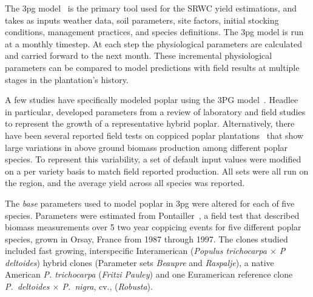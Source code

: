 \documentclass[preprint,12pt]{elsarticle}
\begin{document}
The \acf{3pg} model~\cite{Landsberg1997, landsberg2010physiological,
  Sands2004} is the primary tool used for the \ac{SRWC} yield
estimations, and takes as inputs weather data, soil parameters, site
factors, initial stocking conditions, management practices, and
species definitions.  The \ac{3pg} model is run at a monthly
timestep. At each step the physiological parameters are calculated and
carried forward to the next month.
These incremental physiological parameters
can be compared to model predictions with field results at multiple
stages in the plantation's history.

A few studies have specifically modeled poplar using the 3PG
model~\cite{Amichev2010,Headlee2012,Zalesny2012}. Headlee~\cite{Headlee2012} in
particular, developed parameters from a review of laboratory and field
studies to represent the growth of a representative hybrid poplar.
Alternatively, there have been several reported field tests on
coppiced poplar
plantations~\cite{Proe2002,Proe1999,Pontailler1999,Afas2008a} that
show large variations in above ground biomass production among
different poplar species.  To represent this variability, a set of default input values were modified on a per
variety basis to match field reported production.  All sets were all
run on the region, and the average yield across all species was reported.

The \emph{base} parameters used to model poplar in \ac{3pg} were
altered for each of five species. Parameters were estimated from
Pontailler~\cite{Pontailler1999,pontailler97-volume-index,Ceulemans1993},
a field test that described biomass measurements over 5 two year
coppicing events for five different poplar species, grown in Orsay,
France from 1987 through 1997. The clones studied included fast
growing, interspecific Interamerican (\textit{Populus trichocarpa
  $\times$ P deltoides}) hybrid clones (Parameter sets \emph{Beaupre}
and \emph{Raspalje}), a native American \textit{P. trichocarpa}
(\emph{Fritzi Pauley}) and one Euramerican reference clone
\textit{P.~deltoides $\times$ P.~nigra}, cv., (\emph{Robusta}).
\end{document}
